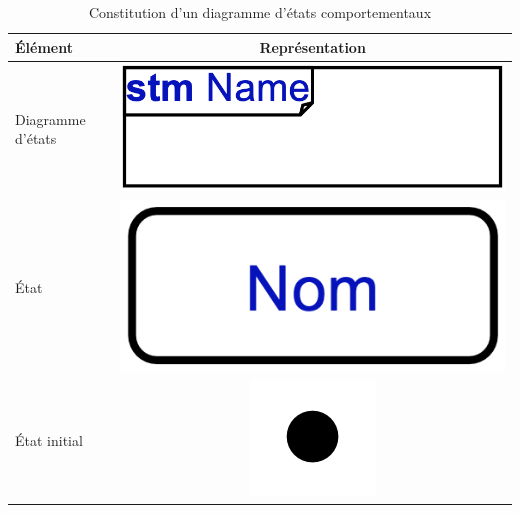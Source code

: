 \begin{table}[H]
	\centering
	\caption{Constitution d'un diagramme d'états comportementaux}
	\label{tbl:diagram_statechart_elements}
	\begin{adjustbox}{max width= \textwidth}
		\begin{tabular}{l|c}
			\toprule
			\textbf{\'El\'ement} & \textbf{Repr\'esentation}\\
			\midrule
			Diagramme d'\'etats & 
			\begin{minipage}{0.2\textwidth}
				\includegraphics[scale=0.4]{./Images/Diagrammes/diagram_statechart_package.png}
			\end{minipage}\\
			\cmidrule(lr){1-2}
			\'Etat & 
			\begin{minipage}{0.2\textwidth}
				\includegraphics[scale=0.4]{./Images/Diagrammes/diagram_activite_elements_activite.png}
			\end{minipage}\\
			\cmidrule(lr){1-2}
			\'Etat initial  & 
			\begin{minipage}[l]{0.3\textwidth}
				\centering
				\includegraphics[scale=0.2]{./Images/Diagrammes/diagram_activite_elements_activite_initial.png}
			\end{minipage}\\

\end{tabular}
\end{adjustbox}
\end{table}
